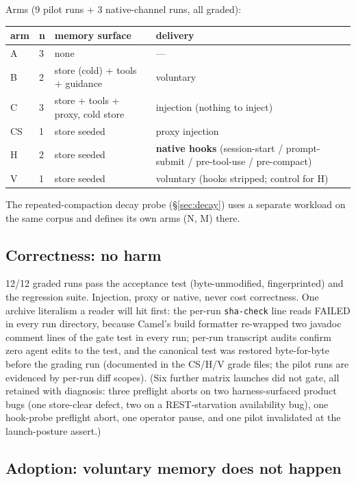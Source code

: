 \documentclass[11pt]{article}
\begin{document}
Arms (9 pilot runs + 3 native-channel runs, all graded):

\begin{table}[h]
\centering
\small
\begin{tabularx}{\textwidth}{@{}llYY@{}}
\toprule
\textbf{arm} & \textbf{n} & \textbf{memory surface} & \textbf{delivery} \\
\midrule
A & 3 & none & --- \\
B & 2 & store (cold) + tools + guidance & voluntary \\
C & 3 & store + tools + proxy, cold store & injection (nothing to inject) \\
CS & 1 & store seeded & proxy injection \\
H & 2 & store seeded & \textbf{native hooks} (session-start / prompt-submit / pre-tool-use / pre-compact) \\
V & 1 & store seeded & voluntary (hooks stripped; control for H) \\
\bottomrule
\end{tabularx}
\end{table}

The repeated-compaction decay probe (\S\ref{sec:decay}) uses a separate workload on
the same corpus and defines its own arms (N, M) there.

\subsection{Correctness: no harm}
\label{sec:correctness}

12/12 graded runs pass the acceptance test (byte-unmodified,
fingerprinted) and the regression suite. Injection, proxy or native,
never cost correctness. One archive literalism a reader will hit
first: the per-run \texttt{sha-check} line reads FAILED in every run
directory, because Camel's build formatter re-wrapped two javadoc
comment lines of the gate test in every run; per-run transcript audits
confirm zero agent edits to the test, and the canonical test was
restored byte-for-byte before the grading run (documented in the
CS/H/V grade files; the pilot runs are evidenced by per-run diff
scopes). (Six further matrix launches did not gate, all retained with
diagnosis: three preflight aborts on two harness-surfaced product bugs
(one store-clear defect, two on a REST-starvation availability bug),
one hook-probe preflight abort, one operator pause, and one pilot
invalidated at the launch-posture assert.)

\subsection{Adoption: voluntary memory does not happen}
\label{sec:adoption}
\end{document}
